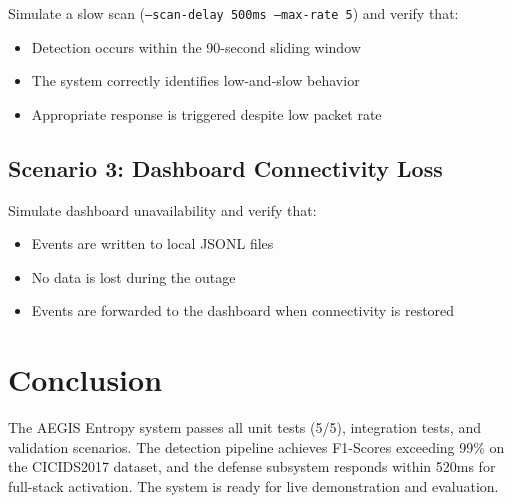 Simulate a slow scan (\texttt{--scan-delay 500ms --max-rate 5}) and verify that:
\begin{itemize}
    \item Detection occurs within the 90-second sliding window
    \item The system correctly identifies low-and-slow behavior
    \item Appropriate response is triggered despite low packet rate
\end{itemize}

\subsection{Scenario 3: Dashboard Connectivity Loss}

Simulate dashboard unavailability and verify that:
\begin{itemize}
    \item Events are written to local JSONL files
    \item No data is lost during the outage
    \item Events are forwarded to the dashboard when connectivity is restored
\end{itemize}

\section{Conclusion}

The AEGIS Entropy system passes all unit tests (5/5), integration tests, and validation scenarios. The detection pipeline achieves F1-Scores exceeding 99\% on the CICIDS2017 dataset, and the defense subsystem responds within 520ms for full-stack activation. The system is ready for live demonstration and evaluation.
